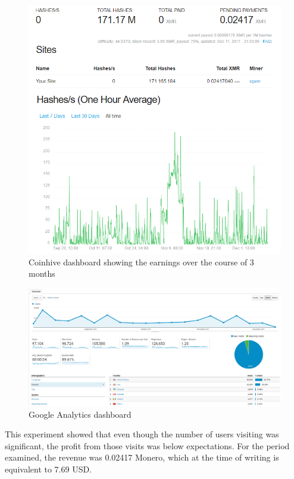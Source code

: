 \begin{figure}[t]
\centering
\includegraphics[width=\linewidth]{figures/experiment_coinhive_results.png}
\caption{Coinhive dashboard showing the earnings over the course of 3 months}
\end{figure}



\begin{figure}[t]
\centering
\includegraphics[width=\linewidth]{figures/experiment_analytics_results.png}
\caption{Google Analytics dashboard}
\end{figure}


This experiment showed that even though the number of users visiting was significant, the profit from those visits was below expectations. For the period examined, the revenue was 0.02417 Monero, which at the time of writing is equivalent to 7.69 USD.


